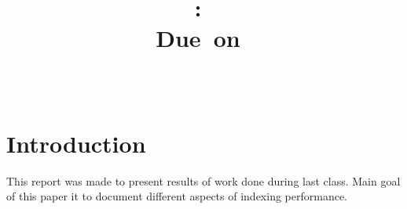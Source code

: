 \documentclass{article}
\title{
\vspace{2in}
\textmd{\textbf{\hmwkClass:\ \hmwkTitle}}\\
\normalsize\vspace{0.1in}\small{Due\ on\ \hmwkDueDate}\\
\vspace{0.1in}\large{\textit{\hmwkClassInstructor\ \hmwkClassTime}}
\vspace{3in}
}
\author{\textbf{\hmwkAuthorName}}
\date{} %
\begin{document}
\maketitle



\newpage

\section{Introduction}
This report was made to present results of work done during last class.
Main goal of this paper it to document different aspects of indexing performance.

\end{document}
